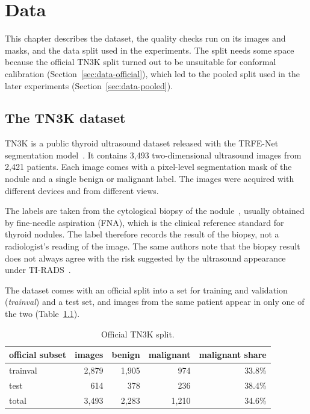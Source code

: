 \chapter{Data}
\label{ch:data}

This chapter describes the dataset, the quality checks run on its images and masks, and the
data split used in the experiments. The split needs some space because the official TN3K split
turned out to be unsuitable for conformal calibration (Section~\ref{sec:data-official}), which
led to the pooled split used in the later experiments (Section~\ref{sec:data-pooled}).

\section{The TN3K dataset}
\label{sec:data-tn3k}

TN3K is a public thyroid ultrasound dataset released with the TRFE-Net segmentation
model~\citep{gong2021tn3k,gong2023trfe}. It contains 3,493 two-dimensional ultrasound images
from 2,421 patients. Each image comes with a pixel-level segmentation mask of the nodule and a
single benign or malignant label. The images were acquired with different devices and from
different views.

The labels are taken from the cytological biopsy
of the nodule~\citep{gong2022acl}, usually obtained by fine-needle aspiration (FNA), which is the
clinical reference standard for thyroid nodules. The label therefore records the result of the
biopsy, not a radiologist's reading of the image. The same authors note that the biopsy result
does not always agree with the risk suggested by the ultrasound appearance under
TI-RADS~\citep{gong2022acl,tessler2017}.

The dataset comes with an official split into a set for training and validation (\emph{trainval})
and a test set, and images from the same patient appear in only one of the two
(Table~\ref{tab:data-official}).

\begin{table}[ht]
  \centering
  \caption{Official TN3K split.}
  \label{tab:data-official}
  \begin{tabular}{lrrrr}
    \toprule
    official subset & images & benign & malignant & malignant share \\
    \midrule
    trainval & 2,879 & 1,905 & 974 & 33.8\% \\
    test     &   614 &   378 & 236 & 38.4\% \\
    \midrule
    total    & 3,493 & 2,283 & 1,210 & 34.6\% \\
    \bottomrule
  \end{tabular}
\end{table}

